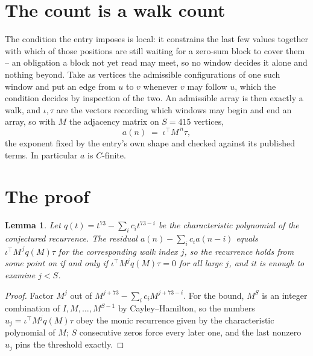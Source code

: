 \documentclass[11pt,a4paper]{article}
\theoremstyle{plain}
\newtheorem{lemma}[theorem]{Lemma}
\theoremstyle{definition}
\begin{document}
\section{The count is a walk count}

The condition the entry imposes is local: it constrains the last few values together with which of those positions are still waiting for a zero-sum block to cover them -- an obligation a block not yet read may meet, so no window decides it alone and nothing beyond. Take as vertices the admissible configurations of one such window and put an edge from $u$ to $v$ whenever $v$ may follow $u$, which the condition decides by inspection of the two.
An admissible array is then exactly a walk, and $\iota,\tau$ are the vectors recording which windows may begin and end an array, so with $M$ the adjacency matrix on $S=415$ vertices,
\[
a(n)\;=\;\iota^{\!\top}M^{\,n}\tau ,
\]
the exponent fixed by the entry's own shape and checked against its published terms. In
particular $a$ is $C$-finite.

\section{The proof}

\begin{lemma}\label{lem:crit}
Let $q(t)=t^{73}-\sum_i c_it^{73-i}$ be the characteristic polynomial of the
conjectured recurrence. The residual $a(n)-\sum_ic_ia(n-i)$ equals
$\iota^{\!\top}M^{\,j}q(M)\tau$ for the corresponding walk index $j$, so the recurrence
holds from some point on if and only if $\iota^{\!\top}M^{j}q(M)\tau=0$ for all large $j$,
and it is enough to examine $j<S$.
\end{lemma}

\begin{proof}
Factor $M^{j}$ out of $M^{j+73}-\sum_ic_iM^{j+73-i}$. For the bound, $M^{S}$
is an integer combination of $I,M,\dots,M^{S-1}$ by Cayley--Hamilton, so the numbers
$u_j=\iota^{\!\top}M^{j}q(M)\tau$ obey the monic recurrence given by the characteristic
polynomial of $M$; $S$ consecutive zeros force every later one, and the last nonzero $u_j$
pins the threshold exactly.
\end{proof}
\end{document}
